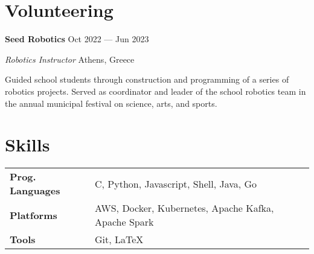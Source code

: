 \documentclass[margin,12pt]{resume}
\newcommand{\descriptionVSpace}{\vspace{0.5ex}\xspace}
\newcommand{\subsectionVSpace}{\vspace{3.5ex}\xspace}
\newcommand{\sectionVSpace}{\vspace{1ex}\xspace} %
\newcommand{\sectionVSpaceCorrection}{\vspace{-3.5ex}} %
\newcommand{\header}[1]{\textbf{#1}\xspace}
\newcommand{\institution}[1]{\header{#1}\xspace}
\newcommand{\interval}[2]{#1 --- #2\xspace}
\newcommand{\place}[1]{#1\xspace}
\newcommand{\project}[2]{\header{\href{#2}{#1}}}
\newcommand{\role}[1]{\textit{#1}\xspace}
\newcommand{\seminar}[1]{\header{#1}\xspace}
\newcommand{\singleDate}[1]{#1\xspace}
\newenvironment{rSubsection}{}{\par\subsectionVSpace}
\newenvironment{rSection}[1]{\sectionVSpaceCorrection\section{#1}\xspace}{\sectionVSpace\par}
\newenvironment{jobDuties}{\descriptionVSpace}{\par}
\newenvironment{projectDescription}{\descriptionVSpace}{\par}
\newenvironment{seminarDescription}{\descriptionVSpace}{\par}
\begin{document}
\begin{resume}




    \begin{rSection}{Volunteering}
        \begin{rSubsection}
            \institution{Seed Robotics} \hfill \interval{Oct 2022}{Jun 2023}

            \role{Robotics Instructor} \hfill \place{Athens, Greece}

            \begin{jobDuties}
                Guided school students through construction and programming of a series of robotics projects.
                Served as coordinator and leader of the school robotics team in the annual municipal festival on science, arts, and sports.
            \end{jobDuties}
        \end{rSubsection}
    \end{rSection}

    \begin{rSection}{Skills}
        \begin{rSubsection}
            \begin{tabular}{@{} >{\bfseries}l l @{}}
                Prog. Languages & C, Python, Javascript, Shell, Java, Go              \\
                Platforms       & AWS, Docker, Kubernetes, Apache Kafka, Apache Spark \\
                Tools           & Git, LaTeX
            \end{tabular}
        \end{rSubsection}
    \end{rSection}


\end{resume}
\end{document}
